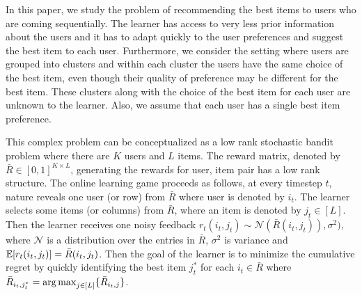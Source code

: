 In this paper, we study the problem of recommending the best items to users who are coming sequentially. The learner has access to very less prior information about the users and it has to adapt quickly to the user preferences and suggest the best item to each user. Furthermore, we consider the setting where users are grouped into clusters and within each cluster the users have the same choice of the best item, even though their quality of preference may be different for the best item. These clusters along with the choice of the best item for each user are unknown to the learner.  Also, we assume that each user has a single best item preference.

	This complex problem can be conceptualized as a low rank stochastic bandit problem where there are $K$ users and $L$ items. The reward matrix, denoted by $\bar{R}\in [0,1]^{K\times L}$,  generating the rewards for user, item pair has a low rank structure. The online learning game proceeds as follows, at every timestep $t$,  nature reveals one user (or row) from $\bar{R}$ where user is denoted by $i_t$. The learner selects some items (or columns) from $\bar{R}$, where an item is denoted by $j_t\in [L]$. Then the learner receives one noisy feedback $r_{t}(i_t,j_t)\sim\mathcal{N}(\bar{R}(i_t,j_t)),\sigma^2)$, where $\mathcal{N}$ is a distribution over the entries in $\bar{R}$, $\sigma^2$ is variance and $\mathbb{E}[r_{t}(i_t,j_t)] = \bar{R}(i_t,j_t)$. Then the goal of the learner is to minimize the cumulative regret by quickly identifying the best item $j^*_t$ for each $i_t\in \bar{R}$ where $\bar{R}_{i_t,j^*_t} = \mathop{\rm arg\,max} _{j\in[L]}\lbrace \bar{R}_{i_t,j} \rbrace$. 
	
	

